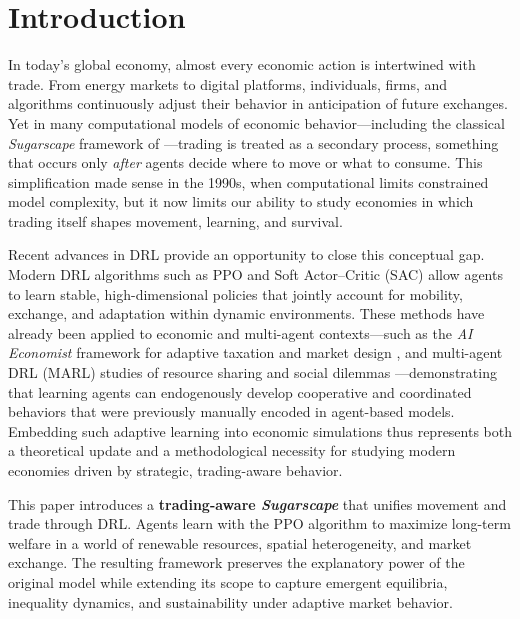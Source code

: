 \documentclass[pdflatex,sn-mathphys-num]{sn-jnl}%
\theoremstyle{thmstyleone}%
\theoremstyle{thmstyletwo}%
\theoremstyle{thmstylethree}%
\begin{document}



\maketitle

\section{Introduction}\label{sec1}

In today’s global economy, almost every economic action is intertwined with trade.  
From energy markets to digital platforms, individuals, firms, and algorithms continuously adjust their behavior in anticipation of future exchanges.  
Yet in many computational models of economic behavior—including the classical \textit{Sugarscape} framework of \citet{EpsteinAxtell1996}—trading is treated as a secondary process, something that occurs only \emph{after} agents decide where to move or what to consume.  
This simplification made sense in the 1990s, when computational limits constrained model complexity, but it now limits our ability to study economies in which trading itself shapes movement, learning, and survival.

Recent advances in DRL provide an opportunity to close this conceptual gap.  
Modern DRL algorithms such as PPO \citep{Schulman2017} and Soft Actor–Critic (SAC) \citep{Haarnoja2018} allow agents to learn stable, high-dimensional policies that jointly account for mobility, exchange, and adaptation within dynamic environments.  
These methods have already been applied to economic and multi-agent contexts—such as the \textit{AI Economist} framework for adaptive taxation and market design \citep{Zheng2022}, and multi-agent DRL (MARL) studies of resource sharing and social dilemmas \citep{Leibo2017, Hughes2018}—demonstrating that learning agents can endogenously develop cooperative and coordinated behaviors that were previously manually encoded in agent-based models.  
Embedding such adaptive learning into economic simulations thus represents both a theoretical update and a methodological necessity for studying modern economies driven by strategic, trading-aware behavior.

This paper introduces a \textbf{trading-aware \textit{Sugarscape}} that unifies movement and trade through DRL.  
Agents learn with the PPO algorithm to maximize long-term welfare in a world of renewable resources, spatial heterogeneity, and market exchange.  
The resulting framework preserves the explanatory power of the original model while extending its scope to capture emergent equilibria, inequality dynamics, and sustainability under adaptive market behavior.
\end{document}
